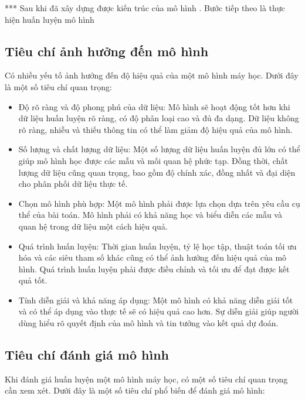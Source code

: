*** Sau khi đã xây dựng được kiến trúc của mô hình . Bước tiếp theo là thực hiện huấn luyện mô hình

\subsection{Tiêu chí ảnh hưởng đến mô hình}	

Có nhiều yếu tố ảnh hưởng đến độ hiệu quả của một mô hình máy học. Dưới đây là một số tiêu chí quan trọng:

\begin{itemize}
	\item Độ rõ ràng và độ phong phú của dữ liệu: Mô hình sẽ hoạt động tốt hơn khi dữ liệu huấn luyện rõ ràng, có độ phân loại cao và đủ đa dạng. Dữ liệu không rõ ràng, nhiễu và thiếu thông tin có thể làm giảm độ hiệu quả của mô hình.
	
	\item Số lượng và chất lượng dữ liệu: Một số lượng dữ liệu huấn luyện đủ lớn có thể giúp mô hình học được các mẫu và mối quan hệ phức tạp. Đồng thời, chất lượng dữ liệu cũng quan trọng, bao gồm độ chính xác, đồng nhất và đại diện cho phân phối dữ liệu thực tế.
	
	\item Chọn mô hình phù hợp: Một mô hình phải được lựa chọn dựa trên yêu cầu cụ thể của bài toán. Mô hình phải có khả năng học và biểu diễn các mẫu và quan hệ trong dữ liệu một cách hiệu quả.
	
	\item Quá trình huấn luyện: Thời gian huấn luyện, tỷ lệ học tập, thuật toán tối ưu hóa và các siêu tham số khác cũng có thể ảnh hưởng đến hiệu quả của mô hình. Quá trình huấn luyện phải được điều chỉnh và tối ưu để đạt được kết quả tốt.
	
	\item Tính diễn giải và khả năng áp dụng: Một mô hình có khả năng diễn giải tốt và có thể áp dụng vào thực tế sẽ có hiệu quả cao hơn. Sự diễn giải giúp người dùng hiểu rõ quyết định của mô hình và tin tưởng vào kết quả dự đoán.	
\end{itemize}

\subsection{Tiêu chí đánh giá mô hình}

Khi đánh giá huấn luyện một mô hình máy học, có một số tiêu chí quan trọng cần xem xét. Dưới đây là một số tiêu chí phổ biến để đánh giá mô hình:

